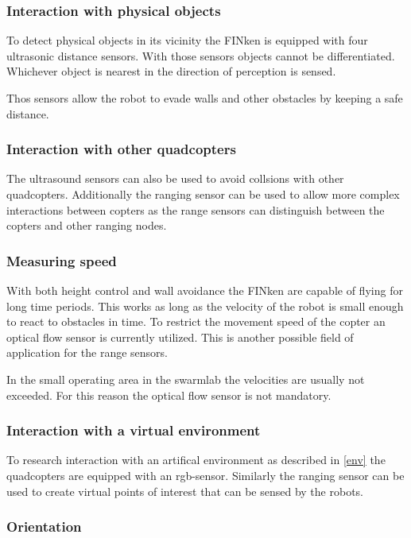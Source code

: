 \subsubsection*{Interaction with physical objects}

To detect physical objects in its vicinity the FINken is equipped with four ultrasonic distance sensors.
With those sensors objects cannot be differentiated.
Whichever object is nearest in the direction of perception is sensed.

Thos sensors allow the robot to evade walls and other obstacles by keeping a safe distance.

\subsubsection*{Interaction with other quadcopters}

The ultrasound sensors can also be used to avoid collsions with other quadcopters.
Additionally the ranging sensor can be used to allow more complex interactions between copters as the range sensors can distinguish between the copters and other ranging nodes.

\subsubsection*{Measuring speed}

With both height control and wall avoidance the FINken are capable of flying for long time periods.
This works as long as the velocity of the robot is small enough to react to obstacles in time.
To restrict the movement speed of the copter an optical flow sensor is currently utilized.
This is another possible field of application for the range sensors.

In the small operating area in the swarmlab the velocities are usually not exceeded.
For this reason the optical flow sensor is not mandatory.

\subsubsection*{Interaction with a virtual environment}

To research interaction with an artifical environment as described in \autoref{env} the quadcopters are equipped with an rgb-sensor.
Similarly the ranging sensor can be used to create virtual points of interest that can be sensed by the robots.

\subsubsection*{Orientation}

